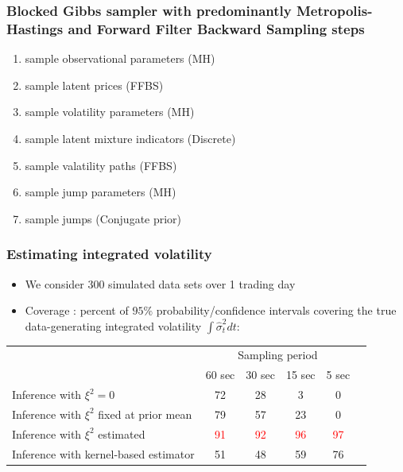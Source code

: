 \documentclass{beamer}
\begin{document}
\begin{frame}
  \frametitle{Blocked Gibbs sampler with predominantly Metropolis-Hastings and Forward Filter Backward Sampling steps}
  \begin{enumerate}
  \item sample observational parameters (MH)
  \item sample latent prices (FFBS)
  \item sample volatility parameters (MH)
  \item sample latent mixture indicators (Discrete)
  \item sample valatility paths (FFBS)
  \item sample jump parameters (MH)
  \item sample jumps (Conjugate prior)
  \end{enumerate}
\end{frame}
\begin{frame}
  \frametitle{Estimating integrated volatility}
  \begin{itemize}
    \item We consider 300 simulated data sets over 1 trading day
  
    \item Coverage : percent of $95\%$ probability/confidence intervals
      covering the true data-generating integrated volatility
      $\int \hat{\sigma}^2_t dt$:
  \end{itemize}
  \begin{table}[h]
\begin{center}
  \begin{tabular}{|l|ccccc|}
    \hline
    & \multicolumn{4}{c|}{Sampling period} \\
    &   	60 sec 	&   30 sec   &   15 sec & 5 sec  \\ \hline \hline
    Inference with $\xi^2 = 0$   &  72  &   28  &	 3 & 0 \\
    Inference with $\xi^2$ fixed at prior mean &  79 & 57 & 23 & 0 \\
    Inference with $\xi^2$ estimated & \textcolor{red}{91} & \textcolor{red}{92} & \textcolor{red}{96} & \textcolor{red}{97}  \\ \hline
    Inference with kernel-based estimator &  51 & 48 & 59  & 76 \\
    \hline
\end{tabular}
\end{center}
\end{table}
\end{frame}
\end{document}

